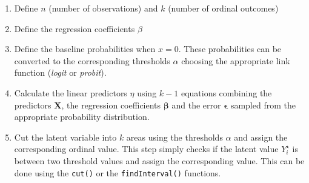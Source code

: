 \documentclass[
  man,floatsintext]{apa6}
\providecommand{\tightlist}{%
  \setlength{\itemsep}{0pt}\setlength{\parskip}{0pt}}
\begin{document}
\begin{enumerate}
\def\labelenumi{\arabic{enumi}.}
\tightlist
\item
  Define \(n\) (number of observations) and \(k\) (number of ordinal outcomes)
\item
  Define the regression coefficients \(\beta\)
\item
  Define the baseline probabilities when \(x = 0\). These probabilities can be converted to the corresponding thresholds \(\alpha\) choosing the appropriate link function (\emph{logit} or \emph{probit}).
\item
  Calculate the linear predictors \(\eta\) using \(k - 1\) equations combining the predictors \(\mathbf{X}\), the regression coefficients \(\boldsymbol{\beta}\) and the error \(\mathbf{\epsilon}\) sampled from the appropriate probability distribution.
\item
  Cut the latent variable into \(k\) areas using the thresholds \(\alpha\) and assign the corresponding ordinal value. This step simply checks if the latent value \(Y^{\star}_i\) is between two threshold values and assign the corresponding value. This can be done using the \texttt{cut()} or the \texttt{findInterval()} functions.
\end{enumerate}

\scriptsize
\end{document}
